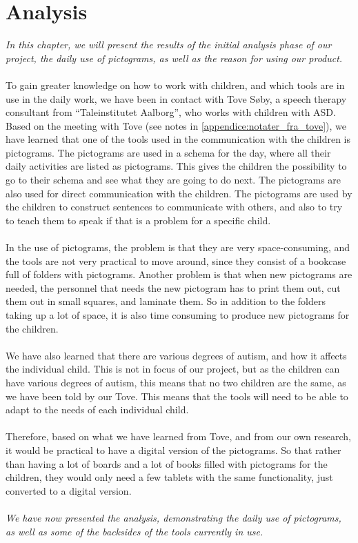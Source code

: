 \chapter{Analysis}

\textit{In this chapter, we will present the results of the initial analysis phase of our project, the daily use of pictograms, as well as the reason for using our product.}\\
\\
To gain greater knowledge on how to work with children, and which tools are in use in the daily work, we have been in contact with  Tove S\o{}by, a speech therapy consultant from ``Taleinstitutet Aalborg'', who works with children with ASD.\\ 

Based on the meeting with Tove (see notes in \autoref{appendice:notater_fra_tove}), we have learned that one of the tools used in the communication with the children is pictograms.
The pictograms are used in a schema for the day, where all their daily activities are listed as pictograms.
This gives the children the possibility to go to their schema and see what they are going to do next. 
The pictograms are also used for direct communication with the children. The pictograms are used by the children to construct sentences to communicate with others, and also to try to teach them to speak if that is a problem for a specific child.\\
\\
In the use of pictograms, the problem is that they are very space-consuming, and the tools are not very practical to move around, since they consist of a bookcase full of folders with pictograms. 
Another problem is that when new pictograms are needed, the personnel that needs the new pictogram has to print them out, cut them out in small squares, and laminate them. 
So in addition to the folders taking up a lot of space, it is also time consuming to produce new pictograms for the children.\\ 
\\
We have also learned that there are various degrees of autism, and how it affects the individual child. 
This is not in focus of our project, but as the children can have various degrees of autism, this means that no two children are the same, as we have been told by our Tove. 
This means that the tools will need to be able to adapt to the needs of each individual child.\\
\\ 
Therefore, based on what we have learned from Tove, and from our own research, it would be practical to have a digital version of the pictograms. So that rather than having a lot of boards and a lot of books filled with pictograms for the children, they would only need a few tablets with the same functionality, just converted to a digital version.\\
\\
\textit{We have now presented the analysis, demonstrating the daily use of pictograms, as well as some of the backsides of the tools currently in use. }